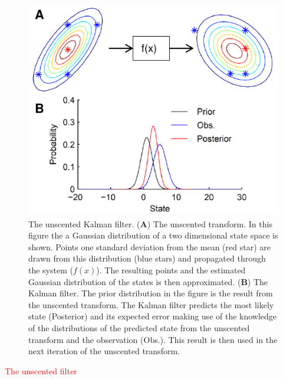 \documentclass{article}%
\newcommand\red{\textcolor{red}}
\begin{document}
 \begin{figure}
 	\centering
 		\includegraphics{fig/UnscentedKalman.pdf}
 	\caption{The unscented Kalman filter. (\textbf{A}) The unscented transform. In this figure the a Gaussian distribution of a two dimensional state space is shown. Points one standard deviation  from the mean (red star) are drawn from this distribution (blue stars) and propagated through the system ($f(x)$). The resulting points and the estimated Gaussian distribution of the states is then approximated. (\textbf{B}) The Kalman filter. The prior distribution in the figure is the result from the unscented transform. The Kalman filter predicts the most likely state (Posterior) and its expected error making use of the knowledge of the distributions of the predicted state from the unscented transform and the observation (Obs.). This result is then used in the next iteration of the unscented transform.}
 	\label{fig: UKF}
 \end{figure}

\red{The unscented filter}
\end{document}
